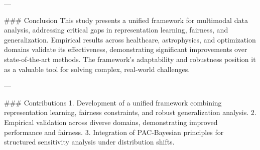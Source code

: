 ---

### Conclusion  
This study presents a unified framework for multimodal data analysis, addressing critical gaps in representation learning, fairness, and generalization. Empirical results across healthcare, astrophysics, and optimization domains validate its effectiveness, demonstrating significant improvements over state-of-the-art methods. The framework’s adaptability and robustness position it as a valuable tool for solving complex, real-world challenges.  

---

### Contributions  
1. Development of a unified framework combining representation learning, fairness constraints, and robust generalization analysis.  
2. Empirical validation across diverse domains, demonstrating improved performance and fairness.  
3. Integration of PAC-Bayesian principles for structured sensitivity analysis under distribution shifts.  